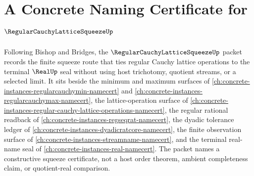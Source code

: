 \chapter{A Concrete Naming Certificate for $\RegularCauchyLatticeSqueezeUp$}
\label{ch:concrete-instances-regular-cauchy-lattice-squeeze-namecert}

Following Bishop and Bridges, the $\RegularCauchyLatticeSqueezeUp$ packet records the finite squeeze route that ties regular Cauchy lattice operations to the terminal $\RealUp$ seal without using host trichotomy, quotient streams, or a selected limit. It sits beside the minimum and maximum surfaces of \autoref{ch:concrete-instances-regularcauchymin-namecert} and \autoref{ch:concrete-instances-regularcauchymax-namecert}, the lattice-operation surface of \autoref{ch:concrete-instances-regular-cauchy-lattice-operations-namecert}, the regular rational readback of \autoref{ch:concrete-instances-regseqrat-namecert}, the dyadic tolerance ledger of \autoref{ch:concrete-instances-dyadicratcore-namecert}, the finite observation surface of \autoref{ch:concrete-instances-streamname-namecert}, and the terminal real-name seal of \autoref{ch:concrete-instances-real-namecert}. The packet names a constructive squeeze certificate, not a host order theorem, ambient completeness claim, or quotient-real comparison.

